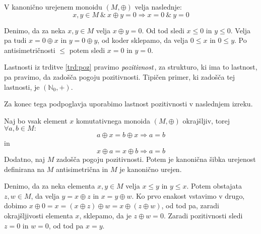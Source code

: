 \documentclass[mat1]{fmfdelo}
\newcommand{\N}{\mathbb{N}}
\newcommand{\No}{\N_0}
\newcommand{\pojem}[1]{\ensuremath{\emph{#1}}}
\begin{document}
\begin{trditev}\label{trd:poz}
	V kanonično urejenem monoidu $(M, \oplus)$ velja naslednje: $$x, y \in M ~\&~ x\oplus y = 0 \Rightarrow x = 0 ~\& ~ y = 0$$
\end{trditev}
\begin{dokaz}
	Denimo, da za neka $x, y\in M$ velja $x \oplus y = 0$. Od tod sledi $x\leq 0$ in $y \leq 0$. Velja pa tudi $x = 0 \oplus x$ in $y = 0 \oplus y$, od koder sklepamo, da velja $0 \leq x$ in $0 \leq y$. Po antisimetričnosti $\leq$ potem sledi $x = 0$ in $y = 0$.
\end{dokaz}

\begin{opomba}
	\label{opomb:poz}
	Lastnosti iz trditve \ref{trd:poz} pravimo \pojem{pozitivnost}, za strukturo, ki ima to lastnost, pa pravimo, da zadošča pogoju pozitivnosti. Tipičen primer, ki zadošča tej lastnosti, je $(\No, +)$. 
\end{opomba}

Za konec tega podpoglavja uporabimo lastnost pozitivnosti v naslednjem izreku.
\begin{izrek}\label{izr:poz}
Naj bo vsak element $x$ komutativnega monoida $(M, \oplus)$ okrajšljiv, torej $\forall a, b\in M:$ $$a\oplus x = b\oplus x \Rightarrow a = b$$ in $$x\oplus a = x\oplus b \Rightarrow a = b$$ Dodatno, naj $M$ zadošča pogoju pozitivnosti. Potem je kanonična šibka urejenost definirana na $M$ antisimetrična in $M$ je kanonično urejen.
\end{izrek}
\begin{dokaz} Denimo, da za neka elementa $x, y\in M$ velja $x\leq y$ in $y\leq x$. Potem obstajata $z, w\in M$, da velja $y = x \oplus z$ in $x = y \oplus w$. Ko prvo enakost vstavimo v drugo, dobimo $x \oplus 0 = x = (x \oplus z) \oplus w = x \oplus (z\oplus w)$, od tod pa, zaradi okrajšljivosti elementa $x$, sklepamo, da je $z\oplus w = 0$. Zaradi pozitivnosti sledi $z = 0$ in $w = 0$, od tod pa $x = y$.
\end{dokaz}
\end{document}
